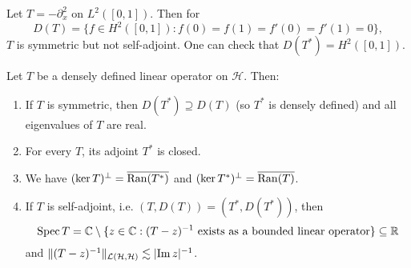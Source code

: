\begin{example}
  Let $T = - \partial_x^2$
  on $L^2([0, 1])$. Then for
  \[
    D(T) = \{f \in H^2([0, 1]) : f(0) = f(1) = f'(0) = f'(1) = 0\},
  \]
  $T$ is symmetric but not self-adjoint. One can check that
  $D(T^*) = H^2([0, 1])$.
\end{example}

\begin{lemma}
  Let $T$ be a densely defined linear operator on
  $\mathcal{H}$. Then:
  \begin{enumerate}
    \item If $T$ is symmetric, then
      $D(T^*) \supseteq D(T)$ (so $T^*$ is 
      densely defined) and all eigenvalues of $T$ are
      real.
    \item For every $T$, its adjoint $T^*$ is closed.
    \item We have $(\ker T)^\perp = \overline{\operatorname{Ran}(T^*)}$
      and $(\ker T^*)^\perp = \overline{\operatorname{Ran}(T)}$.
    \item If $T$ is self-adjoint, i.e. $(T, D(T)) = (T^*, D(T^*))$, then \[\operatorname{Spec} T = \mathbb{C} \setminus \{z \in \mathbb{C} : \text{$(T - z)^{-1}$ exists as a bounded linear operator}\} \subseteq \mathbb{R}\]
      and $\|(T - z)^{-1}\|_{\mathcal{L}(\mathcal{H}, \mathcal{H})} \lesssim |{\operatorname{Im} z}|^{-1}$.
  \end{enumerate}
\end{lemma}

